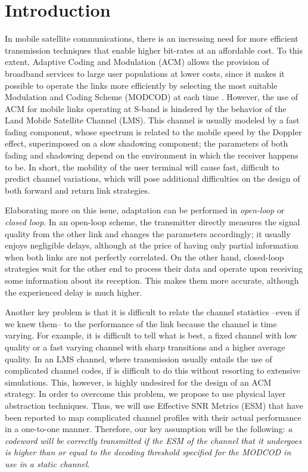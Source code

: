 \documentclass[journal,onecolumn,10pt,a4paper]{IEEEtran}
\begin{document}
\section{Introduction}\label{sec:intro}
In mobile satellite communications, there is an increasing need for more efficient transmission techniques that enable higher bit-rates at an affordable cost. To this extent, Adaptive Coding and Modulation (ACM) allows the provision of broadband services to large user populations at lower costs, since it makes it possible to operate the links more efficiently by selecting the most suitable Modulation and Coding Scheme (MODCOD) at each time \cite{bischl10}. However, the use of ACM for mobile links operating at S-band is hindered by the behavior of the Land Mobile Satellite Channel (LMS)\cite{fontan01}. This channel is usually modeled by a fast fading component, whose spectrum is related to the mobile speed by the Doppler effect, superimposed on a slow shadowing component; the parameters of both fading and shadowing depend on the environment in which the receiver happens to be. In short, the mobility of the user terminal will cause fast, difficult to predict channel variations, which will pose additional difficulties on the design of both forward and return link strategies.

Elaborating more on this issue, adaptation can be performed in {\it open-loop} or {\it closed loop}. In an open-loop scheme, the transmitter directly measures the signal quality from the other link and changes the parameters accordingly; it usually enjoys negligible delays, although at the price of having only partial information when both links are not perfectly correlated. On the other hand, closed-loop strategies wait for the other end to process their data and operate upon receiving some information about its reception. This makes them more accurate, although the experienced delay is much higher.

Another key problem is that it is difficult to relate the channel statistics --even if we knew them-- to the performance of the link because the channel is time varying. For example, it is difficult to tell what is best, a fixed channel with low quality or a fast varying channel with sharp transitions and a higher average quality. In an LMS channel, where transmission usually entails the use of complicated channel codes, if is difficult to do this without resorting to extensive simulations. This, however, is highly undesired for the design of an ACM strategy. In order to overcome this problem, we propose to use physical layer abstraction techniques. Thus, we will use Effective SNR Metrics (ESM) that have been reported to map complicated channel profiles with their actual performance in a one-to-one manner\cite{wimax_rbir}. Therefore, our key assumption will be the following: {\it a codeword will be correctly transmitted if the ESM of the channel that it undergoes is higher than or equal to the decoding threshold specified for the MODCOD in use in a static channel}.
\end{document}
